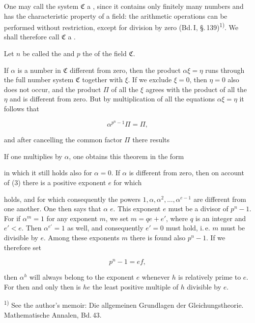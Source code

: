 One may call the system $\mathfrak{C}$ a , since it contains only finitely many numbers and has the characteristic property of a field: the arithmetic operations can be performed without restriction, except for division by zero (Bd.\,I, \S.\,139)\textsuperscript{1)}. We shall therefore call $\mathfrak{C}$ a .

Let $n$ be called the  and $p$ the  of the field $\mathfrak{C}$.

If $\alpha$ is a number in $\mathfrak{C}$ different from zero, then the product $\alpha\xi = \eta$ runs through the full number system $\mathfrak{C}$ together with $\xi$. If we exclude $\xi = 0$, then $\eta = 0$ also does not occur, and the product $\Pi$ of all the $\xi$ agrees with the product of all the $\eta$ and is different from zero. But by multiplication of all the equations $\alpha\xi = \eta$ it follows that

\[
\alpha^{p^n-1}\Pi = \Pi,
\]

and after cancelling the common factor $\Pi$ there results



If one multiplies by $\alpha$, one obtains this theorem in the form


in which it still holds also for $\alpha = 0$. If $\alpha$ is different from zero, then on account of (3) there is a  positive exponent $e$ for which


holds, and for which consequently the powers $1, \alpha, \alpha^2, \ldots, \alpha^{e-1}$ are different from one another. One then says that $\alpha$  $e$. This exponent $e$ must be a divisor of $p^n - 1$. For if $\alpha^m = 1$ for any exponent $m$, we set $m = qe + e'$, where $q$ is an integer and $e' < e$. Then $\alpha^{e'} = 1$ as well, and consequently $e' = 0$ must hold, i.\,e. $m$ must be divisible by $e$. Among these exponents $m$ there is found also $p^n - 1$. If we therefore set

\[
p^n - 1 = ef,
\]

then $\alpha^h$ will always belong to the exponent $e$ whenever $h$ is relatively prime to $e$. For then and only then is $he$ the least positive multiple of $h$ divisible by $e$.

\textsuperscript{1)} See the author's memoir: Die allgemeinen Grundlagen der  Gleichungstheorie. Mathematische Annalen, Bd.\,43.
